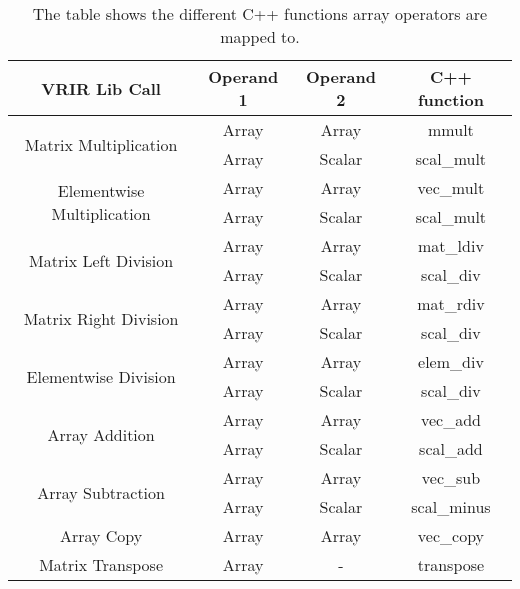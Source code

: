 \begin{table}[h]
\centering
\begin{tabular}{|c|c|c|c|}
\hline
VRIR Lib Call                               & Operand 1 & Operand 2 & C++ function \\ \hline
\multirow{2}{*}{Matrix Multiplication}      & Array     & Array     & mmult        \\ \cline{2-4} 
                                            & Array     & Scalar    & scal\_mult   \\ \hline
\multirow{2}{*}{Elementwise Multiplication} & Array     & Array     & vec\_mult    \\ \cline{2-4} 
                                            & Array     & Scalar    & scal\_mult   \\ \hline
\multirow{2}{*}{Matrix Left Division}       & Array     & Array     & mat\_ldiv    \\ \cline{2-4} 
                                            & Array     & Scalar    & scal\_div    \\ \hline
\multirow{2}{*}{Matrix Right Division}      & Array     & Array     & mat\_rdiv    \\ \cline{2-4} 
                                            & Array     & Scalar    & scal\_div    \\ \hline
\multirow{2}{*}{Elementwise Division}       & Array     & Array     & elem\_div    \\ \cline{2-4} 
                                            & Array     & Scalar    & scal\_div    \\ \hline
\multirow{2}{*}{Array Addition}             & Array     & Array     & vec\_add     \\ \cline{2-4} 
                                            & Array     & Scalar    & scal\_add    \\ \hline
\multirow{2}{*}{Array Subtraction}          & Array     & Array     & vec\_sub     \\ \cline{2-4} 
                                            & Array     & Scalar    & scal\_minus  \\ \hline
Array Copy                                  & Array     & Array     & vec\_copy    \\ \hline
Matrix Transpose                            & Array     & -         & transpose    \\ \hline
\end{tabular}
\caption[arrayOpMap]{The table shows the different C++ functions array operators are mapped to. }
\label{tab:arrayOpMap}
\end{table}

